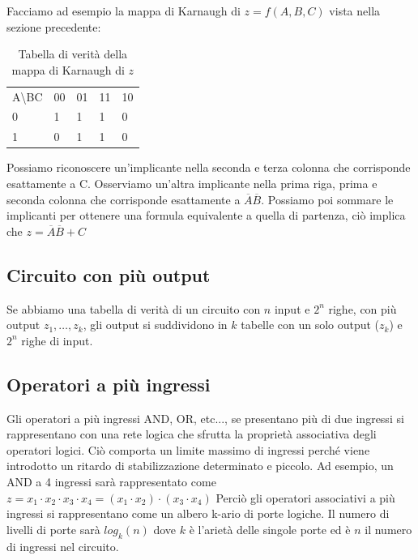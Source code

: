 Facciamo ad esempio la mappa di Karnaugh di $ z = f(A,B,C) $ vista nella sezione precedente:

\begin{table}[H]
	\centering
	\caption{Tabella di verità della mappa di Karnaugh di $z$}
	\label{tab:karnaugh}
	\begin{tabular}{lllll}
		A\textbackslash{}BC    & 00                     & 01                     & 11                     & 10                     \\ \cline{2-5} 
		\multicolumn{1}{l|}{0} & \multicolumn{1}{l|}{1} & \multicolumn{1}{l|}{1} & \multicolumn{1}{l|}{1} & \multicolumn{1}{l|}{0} \\ \cline{2-5} 
		\multicolumn{1}{l|}{1} & \multicolumn{1}{l|}{0} & \multicolumn{1}{l|}{1} & \multicolumn{1}{l|}{1} & \multicolumn{1}{l|}{0} \\ \cline{2-5} 
	\end{tabular}
\end{table}

Possiamo riconoscere un'implicante nella seconda e terza colonna che corrisponde esattamente a C. Osserviamo un'altra implicante nella prima riga, prima e seconda colonna che corrisponde esattamente a $ \overbar{A}\overbar{B} $. Possiamo poi sommare le implicanti per ottenere una formula equivalente a quella di partenza, ciò implica che $ z =  \overbar{A}\overbar{B} + C $


\subsection{Circuito con più output}
Se abbiamo una tabella di verità di un circuito con $ n $ input e $ 2^n $ righe, con più output $ z_1, \dots, z_k $, gli output si suddividono in $ k $ tabelle con un solo output ($ z_k $) e $ 2^n $ righe di input.

\subsection{Operatori a più ingressi}
Gli operatori a più ingressi AND, OR, etc..., se presentano più di due ingressi si rappresentano con una rete logica che sfrutta la proprietà associativa degli operatori logici. Ciò comporta un limite massimo di ingressi perché viene introdotto un ritardo di stabilizzazione determinato e piccolo.
Ad esempio, un AND a 4 ingressi sarà rappresentato come $ z = x_1 \cdot x_2 \cdot x_3 \cdot x_4 = (x_1 \cdot x_2 ) \cdot (x_3 \cdot x_4)  $
Perciò gli operatori associativi a più ingressi si rappresentano come un albero k-ario di porte logiche. Il numero di livelli di porte sarà $ log_k(n) $ dove $ k $ è l'arietà delle singole porte ed è $ n $ il numero di ingressi nel circuito.


